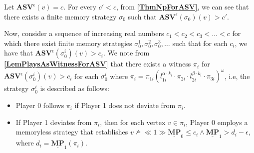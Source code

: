 Let $\mathbf{ASV}^{\epsilon}(v) = c$.
For every $c' < c$, from \textbf{\cref{ThmNpForASV}}, we can see that there exists a finite memory strategy $\sigma_0$ such that $\mathbf{ASV}^{\epsilon}(\sigma_0)(v) > c'$.


Now, consider a sequence of increasing real numbers $c_1 < c_2 < c_3 < \dotsc < c$ for which there exist finite memory strategies $\sigma_0^{1}, \sigma_0^{2}, \sigma_0^{3}, \dotsc$ such that for each $c_i$, we have that $ \mathbf{ASV}^{\epsilon}(\sigma_0^i)(v) > c_i$.
We note from \textbf{\cref{LemPlaysAsWitnessForASV}} that there exists a witness $\pi_i$ for $ \mathbf{ASV}^{\epsilon}(\sigma_0^i)(v) > c_i$ for each $\sigma_0^i$ where $\pi_i= \pi_{1i}(l^{\alpha \cdot k_i}_{1i} \cdot \pi_{2i} \cdot l^{\beta \cdot k_i}_{2i} \cdot \pi_{3i})^{\omega}$, i.e, the strategy $\sigma_0^i$ is described as follows:
\begin{itemize}
    \item Player 0 follows $\pi_i$ if Player 1 does not deviate from $\pi_i$.
    \item If Player 1 deviates from $\pi_i$, then for each vertex $v \in \pi_i$, Player 0 employs a memoryless strategy that establishes $v \nvDash \ll 1 \gg \underline{\mathbf{MP}}_0 \leqslant c_i \land \underline{\mathbf{MP}}_1 > d_i - \epsilon$, where $d_i = \underline{\mathbf{MP}}_1(\pi_i)$.
\end{itemize}

